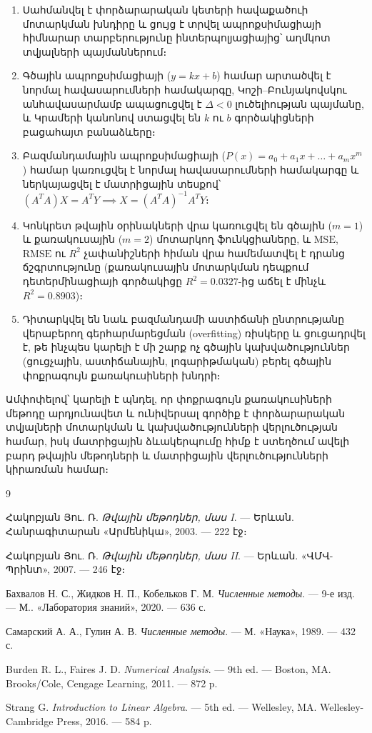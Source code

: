 \documentclass[12pt,a4paper]{article}
\numberwithin{equation}{section}
\numberwithin{figure}{section}
\begin{document}
\begin{enumerate}
    \item Սահմանվել է փորձարարական կետերի հավաքածուի մոտարկման խնդիրը և ցույց է տրվել ապրոքսիմացիայի հիմնարար տարբերությունը ինտերպոլյացիայից՝ աղմկոտ տվյալների պայմաններում։
    \item Գծային ապրոքսիմացիայի ($y = kx + b$) համար արտածվել է նորմալ հավասարումների համակարգը, Կոշի–Բունյակովսկու անհավասարմամբ ապացուցվել է $\Delta < 0$ լուծելիության պայմանը, և Կրամերի կանոնով ստացվել են $k$ ու $b$ գործակիցների բացահայտ բանաձևերը։
    \item Բազմանդամային ապրոքսիմացիայի ($P(x) = a_0 + a_1 x + \dots + a_m x^m$) համար կառուցվել է նորմալ հավասարումների համակարգը և ներկայացվել է մատրիցային տեսքով՝ $(A^T A)X = A^T Y \implies X = (A^T A)^{-1} A^T Y$։
    \item Կոնկրետ թվային օրինակների վրա կառուցվել են գծային ($m = 1$) և քառակուսային ($m = 2$) մոտարկող ֆունկցիաները, և $\mathrm{MSE}$, $\mathrm{RMSE}$ ու $R^2$ չափանիշների հիման վրա համեմատվել է դրանց ճշգրտությունը (քառակուսային մոտարկման դեպքում դետերմինացիայի գործակիցը $R^2 = 0.0327$-ից աճել է մինչև $R^2 = 0.8903$)։
    \item Դիտարկվել են նաև բազմանդամի աստիճանի ընտրությանը վերաբերող գերհարմարեցման (overfitting) ռիսկերը և ցուցադրվել է, թե ինչպես կարելի է մի շարք ոչ գծային կախվածություններ (ցուցչային, աստիճանային, լոգարիթմական) բերել գծային փոքրագույն քառակուսիների խնդրի։
\end{enumerate}

Ամփոփելով՝ կարելի է պնդել, որ փոքրագույն քառակուսիների մեթոդը արդյունավետ և ունիվերսալ գործիք է փորձարարական տվյալների մոտարկման և կախվածությունների վերլուծության համար, իսկ մատրիցային ձևակերպումը հիմք է ստեղծում ավելի բարդ թվային մեթոդների և մատրիցային վերլուծությունների կիրառման համար։

\newpage 

\renewcommand{\refname}{ԳՐԱԿԱՆՈՒԹՅԱՆ ՑԱՆԿ}
\begin{thebibliography}{9}

Հակոբյան Յու. Ռ. \textit{Թվային մեթոդներ, մաս I}. — Երևան. Հանրագիտարան «Արմենիկա», 2003. — 222 էջ։

Հակոբյան Յու. Ռ. \textit{Թվային մեթոդներ, մաս II}. — Երևան. «ՎՄՎ-Պրինտ», 2007. — 246 էջ։

Бахвалов Н. С., Жидков Н. П., Кобельков Г. М. \textit{Численные методы}. — 9-е изд. — М.. «Лаборатория знаний», 2020. — 636 с.

Самарский А. А., Гулин А. В. \textit{Численные методы}. — М. «Наука», 1989. — 432 с.

Burden R. L., Faires J. D. \textit{Numerical Analysis}. — 9th ed. — Boston, MA. Brooks/Cole, Cengage Learning, 2011. — 872 p.

Strang G. \textit{Introduction to Linear Algebra}. — 5th ed. — Wellesley, MA. Wellesley-Cambridge Press, 2016. — 584 p.

\end{thebibliography}
\end{document}
